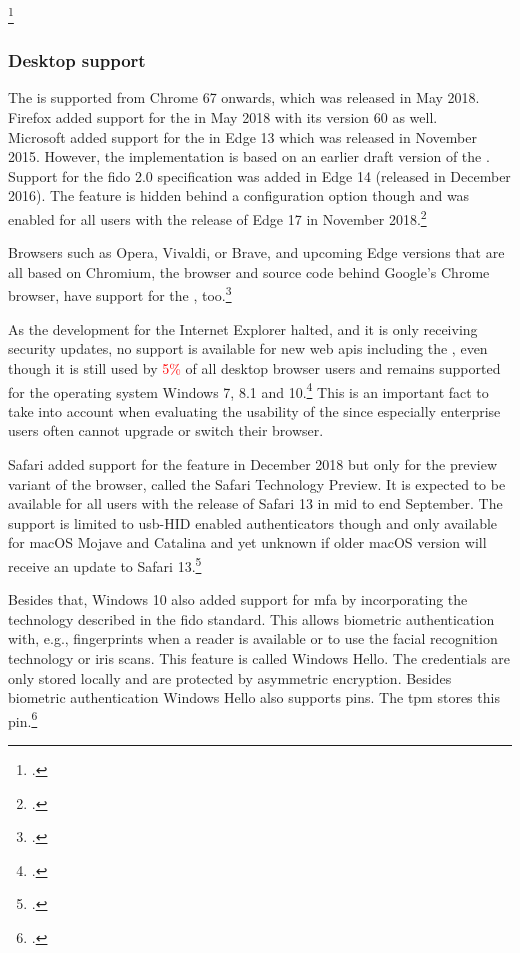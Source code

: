 \footcitetexts[Sources:][]{chrome-webauthn}{firefox-webauthn}{safari-webauthn}{chrome-android-webauthn}[a detailed analysis of Android browsers is available on the CD in the appendix.]{firefox-android-webauthn}
\newpage

\subsubsection{Desktop support}

The \wa{} is supported from Chrome 67 onwards, which was released in May 2018. Firefox added support for the \wa{} in May 2018 with its version 60 as well.\\
Microsoft added support for the \wa{} in Edge 13 which was released in November 2015. However, the implementation is based on an earlier draft version of the \wa. Support for the \gls{fido} 2.0 specification was added in Edge 14 (released in December 2016). The feature is hidden behind a configuration option though and was enabled for all users with the release of Edge 17 in November 2018.\footcite[See][112]{Jacobs:2019}

Browsers such as Opera, Vivaldi, or Brave, and upcoming Edge versions that are all based on Chromium, the browser and source code behind Google's Chrome browser, have support for the \wa, too.\footcites[See][Chapter 7.1]{kissell2019take}

As the development for the Internet Explorer halted, and it is only receiving security updates, no support is available for new web \glspl{api} including the \wa, even though it is still used by \textcolor{red}{5\%} of all desktop browser users and remains supported for the operating system Windows 7, 8.1 and 10.\footcite[See][]{ie-support}
 This is an important fact to take into account when evaluating the usability of the \wa{} since especially enterprise users often cannot upgrade or switch their browser.

Safari added support for the \wa{} feature in December 2018 but only for the preview variant of the browser, called the Safari Technology Preview. It is expected to be available for all users with the release of Safari 13 in mid to end September. The support is limited to \gls{usb}-HID enabled authenticators though and only available for macOS Mojave and Catalina and yet unknown if older macOS version will receive an update to Safari 13.\footcites[See][]{safari-webauthn}

Besides that, Windows 10 also added support for \gls{mfa} by incorporating the technology described in the \gls{fido} standard. This allows biometric authentication with, e.g., fingerprints when a reader is available or to use the facial recognition technology or iris scans. This feature is called \frqq Windows Hello\flqq{}. The credentials are only stored locally and are protected by asymmetric encryption. Besides biometric authentication Windows Hello also supports \glspl{pin}. The \gls{tpm} stores this \gls{pin}.\footcite[See][]{201612}

